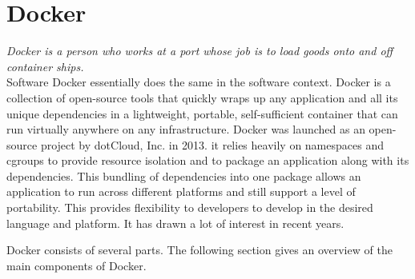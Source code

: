 	\section{Docker}
	\label{Grundlagen:Docker}
	\textit{Docker is a person who works at a port whose job is to load goods onto and off container ships.} \cite{docker-definition-english}\\

	Software Docker essentially does the same in the software context. Docker is a collection of open-source tools that quickly wraps up any application and all its unique dependencies in a lightweight, portable, self-sufficient container that can run virtually anywhere on any infrastructure.\cite{docker-definition}
	Docker was launched as an open-source project by dotCloud, Inc. in
	2013. it relies heavily on namespaces and cgroups to provide resource isolation and to package an application along with its dependencies. This bundling of dependencies into one package allows an application to run across different platforms and still support a level of portability. This provides flexibility to developers to develop in the desired language and platform. It has drawn a lot of interest in recent years.\cite[P.~10]{Kinnary2018}

	Docker consists of several parts. The following section gives an overview of the main components of Docker.


